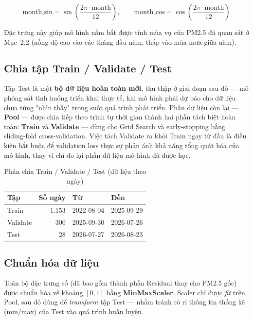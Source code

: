 \documentclass[12pt,oneside]{report}
\begin{document}
\begin{equation}
\text{month\_sin} = \sin\!\left(\frac{2\pi \cdot \text{month}}{12}\right), \qquad
\text{month\_cos} = \cos\!\left(\frac{2\pi \cdot \text{month}}{12}\right)
\end{equation}

Đặc trưng này giúp mô hình nắm bắt được tính mùa vụ của PM2.5 đã quan sát ở Mục~2.2 (nồng độ cao vào các tháng đầu năm, thấp vào mùa mưa giữa năm).

\subsection*{Chia tập Train / Validate / Test}

Tập Test là một \textbf{bộ dữ liệu hoàn toàn mới}, thu thập ở giai đoạn sau đó — mô phỏng sát tình huống triển khai thực tế, khi mô hình phải dự báo cho dữ liệu chưa từng "nhìn thấy" trong suốt quá trình phát triển. Phần dữ liệu còn lại — \textbf{Pool} — được chia tiếp theo trình tự thời gian thành hai phần tách biệt hoàn toàn: \textbf{Train} và \textbf{Validate} — dùng cho Grid Search và early-stopping bằng sliding-fold cross-validation. Việc tách Validate ra khỏi Train ngay từ đầu là điều kiện bắt buộc để validation loss thực sự phản ánh khả năng tổng quát hóa của mô hình, thay vì chỉ đo lại phần dữ liệu mô hình đã được học.

\begin{table}[H]
\centering
\caption{Phân chia Train / Validate / Test (dữ liệu theo ngày)}
\begin{tabular}{lrll}
\toprule
Tập & Số ngày & Từ & Đến \\
\midrule
Train & 1.153 & 2022-08-04 & 2025-09-29 \\
Validate & 300 & 2025-09-30 & 2026-07-26 \\
Test & 28 & 2026-07-27 & 2026-08-23 \\
\bottomrule
\end{tabular}
\end{table}

\subsection*{Chuẩn hóa dữ liệu}

Toàn bộ đặc trưng số (đã bao gồm thành phần Residual thay cho PM2.5 gốc) được chuẩn hóa về khoảng $[0,1]$ bằng \textbf{MinMaxScaler}. Scaler chỉ được \textit{fit} trên Pool, sau đó dùng để \textit{transform} tập Test — nhằm tránh rò rỉ thông tin thống kê (min/max) của Test vào quá trình huấn luyện.
\end{document}
